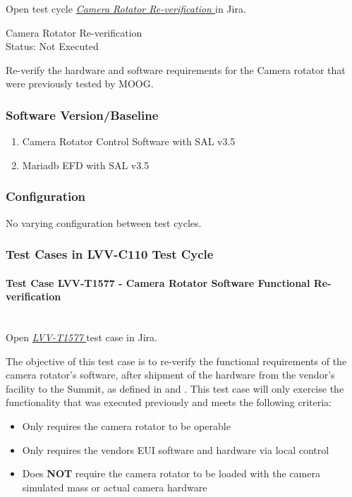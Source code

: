 \documentclass[SE,lsstdraft,STR,toc]{lsstdoc}
\providecommand{\tightlist}{
  \setlength{\itemsep}{0pt}\setlength{\parskip}{0pt}}
\begin{document}
Open test cycle {\it \href{https://jira.lsstcorp.org/secure/Tests.jspa#/testrun/LVV-C110}{Camera Rotator Re-verification
}} in Jira.

Camera Rotator Re-verification
\\
Status: Not Executed

Re-verify the hardware and software requirements for the Camera rotator
that were previously tested by MOOG.


\subsubsection{Software Version/Baseline}
\begin{enumerate}
\tightlist
\item
  Camera Rotator Control Software with SAL v3.5
\item
  Mariadb EFD with SAL v3.5
\end{enumerate}


\subsubsection{Configuration}
No varying configuration between test cycles.


\subsubsection{Test Cases in LVV-C110 Test Cycle}

\paragraph{Test Case LVV-T1577 - Camera Rotator Software Functional Re-verification
 }\mbox{}\\

Open  \href{https://jira.lsstcorp.org/secure/Tests.jspa#/testCase/LVV-T1577}{\textit{ LVV-T1577 } }
test case in Jira.

The objective of this test case is to re-verify the functional
requirements of the camera rotator's software, after shipment of the
hardware from the vendor's facility to the Summit, as defined in 
and . This test case will only exercise the functionality that
was executed previously and meets the following criteria:

\begin{itemize}
\tightlist
\item
  Only requires the camera rotator to be operable
\item
  Only requires the vendors EUI software and hardware via local control
\item
  Does \textbf{NOT} require the camera rotator to be loaded with the
  camera simulated mass or actual camera hardware
\end{itemize}
\end{document}
